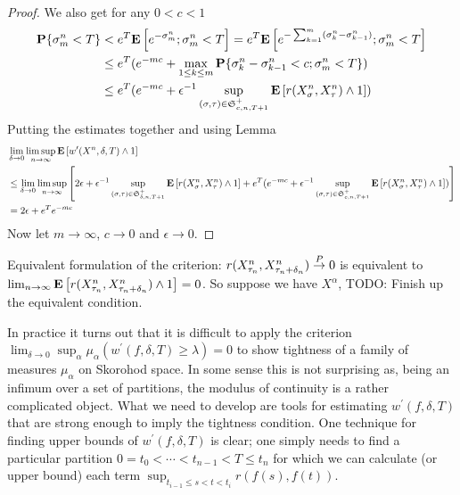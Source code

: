 \begin{proof}
We also get for any $0 < c < 1$ 
\begin{align*}
\textbf{P}\{\sigma^n_m < T\} &< e^T \textbf{E}\left[e^{-\sigma^n_m}; \sigma^n_m < T\right] = e^T \textbf{E}\left[e^{-\sum_{k=1}^m (\sigma^n_k-\sigma^n_{k-1})}; \sigma^n_m < T\right] \\
&\leq e^T (e^{-mc} + \max_{1 \leq k \leq m} \textbf{P}\{\sigma^n_k-\sigma^n_{k-1} < c ; \sigma^n_m < T\}) \\
&\leq e^T (e^{-mc} + \epsilon^{-1} \sup_{(\sigma, \tau) \in \mathfrak{S}^+_{c,n,T+1}} \textbf{E}\left[r(X^n_\sigma, X^n_\tau) \wedge 1\right])
\end{align*}
Putting the estimates together and using Lemma \label{AldousCriterionExponentialEstimate}
\begin{align*}
&\lim_{\delta \to 0} \limsup_{n \to \infty} \textbf{E}\left[w^\prime(X^n, \delta, T) \wedge 1\right] \\
&\leq \lim_{\delta \to 0} \limsup_{n \to \infty} \left[ 2 \epsilon + \epsilon^{-1} \sup_{(\sigma, \tau) \in \mathfrak{S}^+_{\delta,n,T+1}} \textbf{E}\left[r(X^n_\sigma, X^n_\tau) \wedge 1\right] + e^T (e^{-mc} + \epsilon^{-1} \sup_{(\sigma, \tau) \in \mathfrak{S}^+_{c,n,T+1}} \textbf{E}\left[r(X^n_\sigma, X^n_\tau) \wedge 1\right])\right] \\
&=2\epsilon + e^T e^{-mc}
\end{align*}
Now let $m \to \infty$, $c \to 0$ and $\epsilon \to 0$.
\end{proof}

Equivalent formulation of the criterion: $r(X^n_{\tau_n}, X^n_{\tau_n + \delta_n}) \overset{P}\to 0$ is equivalent to $\lim_{n \to \infty} \textbf{E}\left[r(X^n_{\tau_n}, X^n_{\tau_n + \delta_n}) \wedge 1\right] = 0$.  So suppose we have $X^\alpha$,  TODO:  Finish up the equivalent condition.

In practice it turns out that it is difficult to apply the criterion $\lim_{\delta \to 0} \sup_{\alpha} \mu_\alpha( w^\prime(f, \delta, T) \geq \lambda) = 0$ to show tightness of a family of
measures $\mu_\alpha$ on Skorohod space.  In some sense this is not surprising as, being an infimum over a set of partitions, the modulus of continuity is a rather complicated object.  What we need to develop are tools for estimating $w^\prime(f, \delta, T)$ that are strong enough to imply the tightness condition.  One technique for finding upper bounds of $w^\prime(f, \delta, T)$ is clear; one simply needs to find a particular partition $0=t_0 < \dotsb < t_{n-1} < T \leq t_n$ for which we can calculate (or upper bound) each term
$\sup_{t_{i-1} \leq s < t < t_i} r(f(s), f(t))$.  

